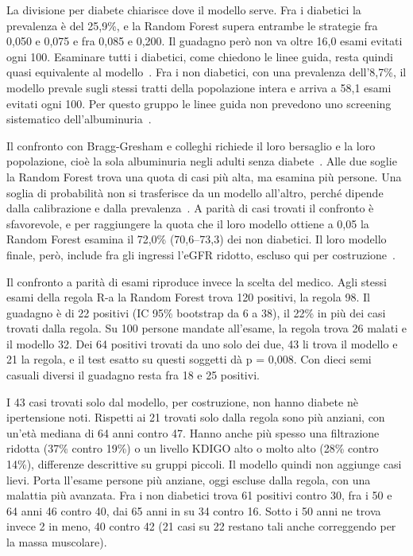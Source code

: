 \documentclass[a4paper, 12pt, oneside]{book}
\begin{document}
La divisione per diabete chiarisce dove il modello serve. Fra i diabetici la prevalenza è del 25,9\%, e la Random Forest supera entrambe le strategie fra 0,050 e 0,075 e fra 0,085 e 0,200. Il guadagno però non va oltre 16,0 esami evitati ogni 100. Esaminare tutti i diabetici, come chiedono le linee guida, resta quindi quasi equivalente al modello~\cite{american_diabetes_association_professional_practice_committee_11_2024}. Fra i non diabetici, con una prevalenza dell'8,7\%, il modello prevale sugli stessi tratti della popolazione intera e arriva a 58,1 esami evitati ogni 100. Per questo gruppo le linee guida non prevedono uno screening sistematico dell'albuminuria~\cite{bragg-gresham_using_2025}.

Il confronto con Bragg-Gresham e colleghi richiede il loro bersaglio e la loro popolazione, cioè la sola albuminuria negli adulti senza diabete~\cite{bragg-gresham_using_2025}. Alle due soglie la Random Forest trova una quota di casi più alta, ma esamina più persone. Una soglia di probabilità non si trasferisce da un modello all'altro, perché dipende dalla calibrazione e dalla prevalenza~\cite{van_calster_evaluation_2025}. A parità di casi trovati il confronto è sfavorevole, e per raggiungere la quota che il loro modello ottiene a 0,05 la Random Forest esamina il 72,0\% (70,6--73,3) dei non diabetici. Il loro modello finale, però, include fra gli ingressi l'eGFR ridotto, escluso qui per costruzione~\cite{bragg-gresham_using_2025}.

Il confronto a parità di esami riproduce invece la scelta del medico. Agli stessi esami della regola R-a la Random Forest trova 120 positivi, la regola 98. Il guadagno è di 22 positivi (IC 95\% bootstrap da 6 a 38), il 22\% in più dei casi trovati dalla regola. Su 100 persone mandate all'esame, la regola trova 26 malati e il modello 32. Dei 64 positivi trovati da uno solo dei due, 43 li trova il modello e 21 la regola, e il test esatto su questi soggetti dà p = 0,008. Con dieci semi casuali diversi il guadagno resta fra 18 e 25 positivi.

I 43 casi trovati solo dal modello, per costruzione, non hanno diabete nè ipertensione noti. Rispetti ai 21 trovati solo dalla regola sono più anziani, con un'età mediana di 64 anni contro 47. Hanno anche più spesso una filtrazione ridotta (37\% contro 19\%) o un livello KDIGO alto o molto alto (28\% contro 14\%), differenze descrittive su gruppi piccoli. Il modello quindi non aggiunge casi lievi. Porta ll'esame persone più anziane, oggi escluse dalla regola, con una malattia più avanzata. Fra i non diabetici trova 61 positivi contro 30, fra i 50 e 64 anni 46 contro 40, dai 65 anni in su 34 contro 16. Sotto i 50 anni ne trova invece 2 in meno, 40 contro 42 (21 casi su 22 restano tali anche correggendo per la massa muscolare).
\end{document}
